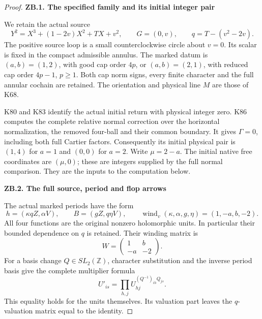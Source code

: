 \begin{proof}
\par

\medskip\noindent\textbf{ZB.1. The specified family and its initial integer pair}

\par\nopagebreak[4]

We retain the actual source
\[
Y^2=X^3+(1-2v)X^2+TX+v^2,\qquad G=(0,v),\qquad
q=T-(v^2-2v).
\]
The positive source loop is a small counterclockwise circle about
\(v=0\). Its scalar is fixed in the compact admissible annulus. The
marked datum is \((a,b)=(1,2)\), with good cap order \(4p\), or
\((a,b)=(2,1)\), with reduced cap order \(4p-1\), \(p\ge1\).
Both cap norm signs, every finite character and the full annular cochain
are retained. The orientation and physical line \(M\) are those of K68.

K80 and K83 identify the actual initial return with physical integer
zero. K86 computes the complete relative normal correction over the
horizontal normalization, the removed four-ball and their common
boundary. It gives \(\Gamma=0\), including both full Cartier factors.
Consequently its initial physical pair is \((1,4)\) for \(a=1\) and
\((0,0)\) for \(a=2\). Write \(\mu=2-a\). The initial native free
coordinates are \((\mu,0)\); these are integers supplied by the full
normal comparison. They are the inputs to the computation below.

\par

\medskip\noindent\textbf{ZB.2. The full source, period and flop arrows}

\par\nopagebreak[4]

The actual marked periods have the form
\[
h=(\kappa qZ,\alpha V),\qquad B=(gZ,q\eta V),
\qquad
\operatorname{wind}_v(\kappa,\alpha,g,\eta)=(1,-a,b,-2).
\]
All four functions are the original nonzero holomorphic units. In
particular their bounded dependence on \(q\) is retained. Their winding
matrix is
\[
W=\begin{pmatrix}1&b\\-a&-2\end{pmatrix}.
\]
For a basis change \(Q\in SL_2(\mathbb Z)\), character substitution
and the inverse period basis give the complete multiplier formula
\[
U'_{is}=\prod_{h,j}U_{hj}^{(Q^{-1})_{ih}Q_{js}}.             \tag{ZB.1}
\]
This equality holds for the units themselves. Its valuation part leaves
the \(q\)-valuation matrix equal to the identity.


\end{proof}
